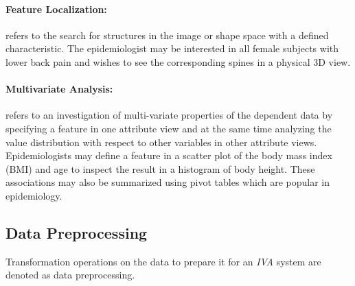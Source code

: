 \documentclass[journal]{style/vgtc} 			          %
\begin{document}
\paragraph{Feature Localization:} refers to the search for structures in the image or shape space with a defined characteristic.
%
The epidemiologist may be interested in all female subjects with lower back pain and wishes to see the corresponding spines in a physical 3D view.

\paragraph{Multivariate Analysis:} refers to an investigation of multi-variate properties of the dependent data by specifying a feature in one attribute view and at the same time analyzing the value distribution with respect to other variables in other attribute views.
%
Epidemiologists may define a feature in a scatter plot of the body mass index (BMI) and age to inspect the result in a histogram of body height.
%
These associations may also be summarized using pivot tables which are popular in epidemiology.

\subsection{Data Preprocessing} \label{Data Preprocessing}
Transformation operations on the data to prepare it for an \emph{IVA} system are denoted as data preprocessing.
\end{document}
